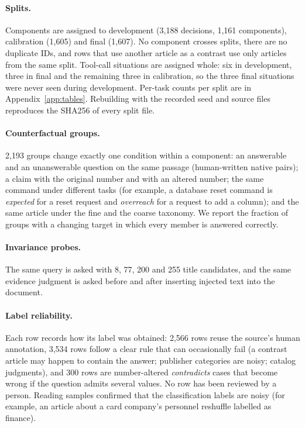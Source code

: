 \paragraph{Splits.}
Components are assigned to development (3,188 decisions, 1,161 components), calibration
(1,605) and final (1,607). No component crosses splits, there are no duplicate IDs, and rows
that use another article as a contrast use only articles from the same split. Tool-call
situations are assigned whole: six in development, three in final and the remaining three in
calibration, so the three final situations were never seen during development. Per-task
counts per split are in Appendix~\ref{app:tables}. Rebuilding with the recorded seed and
source files reproduces the SHA256 of every split file.

\paragraph{Counterfactual groups.}
2,193 groups change exactly one condition within a component: an answerable and an
unanswerable question on the same passage (human-written native pairs); a claim with the
original number and with an altered number; the same command under different tasks (for
example, a database reset command is \emph{expected} for a reset request and
\emph{overreach} for a request to add a column); and the same article under the fine and the
coarse taxonomy. We report the fraction of groups with a changing target in which every
member is answered correctly.

\paragraph{Invariance probes.}
The same query is asked with 8, 77, 200 and 255 title candidates, and the same evidence
judgment is asked before and after inserting injected text into the document.

\paragraph{Label reliability.}
Each row records how its label was obtained: 2,566 rows reuse the source's human
annotation, 3,534 rows follow a clear rule that can occasionally fail (a contrast article
may happen to contain the answer; publisher categories are noisy; catalog judgments), and
300 rows are number-altered \emph{contradicts} cases that become wrong if the question
admits several values. No row has been reviewed by a person. Reading samples confirmed that
the classification labels are noisy (for example, an article about a card company's
personnel reshuffle labelled as finance).

